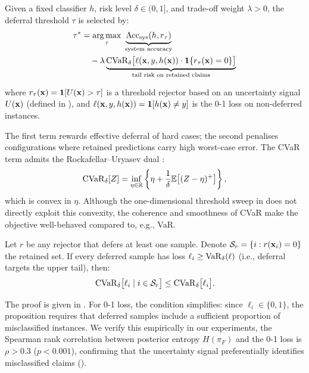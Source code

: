 \begin{definition}
\label{def:cvar_l2d}
Given a fixed classifier $h$, risk level $\delta \in (0,1]$, and trade-off weight $\lambda > 0$, the deferral threshold $\tau$ is selected by:
\begin{equation}
\begin{aligned}
\tau^*
&= \operatorname*{arg\,max}_{\tau} \;
\underbrace{\mathrm{Acc}_{\mathrm{sys}}(h, r_\tau)}_{\text{system accuracy}} \\
&\quad - \lambda \underbrace{\mathrm{CVaR}_\delta\bigl[\ell(\mathbf{x}, y, h(\mathbf{x})) \cdot \mathbf{1}\{r_\tau(\mathbf{x}) = 0\}\bigr]}_{\text{tail risk on retained claims}}
\end{aligned}
\label{eq:cvar_l2d}
\end{equation}

where $r_\tau(\mathbf{x}) = \mathbf{1}[U(\mathbf{x}) > \tau]$ is a threshold rejector based on an uncertainty signal $U(\mathbf{x})$ (defined in ), and $\ell(\mathbf{x}, y, h(\mathbf{x})) = \mathbf{1}[h(\mathbf{x}) \neq y]$ is the 0-1 loss on non-deferred instances.
\end{definition}

The first term rewards effective deferral of hard cases; the second penalises configurations where retained predictions carry high worst-case error. The CVaR term admits the Rockafellar--Uryasev dual \citep{rockafellar2000optimization}:
\begin{equation}
    \mathrm{CVaR}_\delta[Z] = \inf_{\eta \in \mathbb{R}} \left\{ \eta + \frac{1}{\delta}\mathbb{E}\bigl[(Z - \eta)^+\bigr] \right\},
    \label{eq:cvar_dual}
\end{equation}
which is convex in $\eta$. Although the one-dimensional threshold sweep in  does not directly exploit this convexity, the coherence and smoothness of CVaR make the objective well-behaved compared to, e.g., VaR.

\begin{proposition}
\label{prop:cvar_bound}
Let $r$ be any rejector that defers at least one sample. Denote $\mathcal{S}_r = \{i : r(\mathbf{x}_i) = 0\}$ the retained set. If every deferred sample has loss $\ell_i \geq \mathrm{VaR}_\delta(\ell)$ (i.e., deferral targets the upper tail), then:
\begin{equation}
    \mathrm{CVaR}_\delta\bigl[\ell_i \mid i \in \mathcal{S}_r\bigr] \leq \mathrm{CVaR}_\delta\bigl[\ell_i\bigr].
\end{equation}
\end{proposition}
The proof is given in . For 0-1 loss, the condition simplifies: since $\ell_i \in \{0,1\}$, the proposition requires that deferred samples include a sufficient proportion of misclassified instances. We verify this empirically in our experiments, the Spearman rank correlation between posterior entropy $H(\pi_F)$ and the 0-1 loss is $\rho > 0.3$ ($p < 0.001$), confirming that the uncertainty signal preferentially identifies misclassified claims ().

